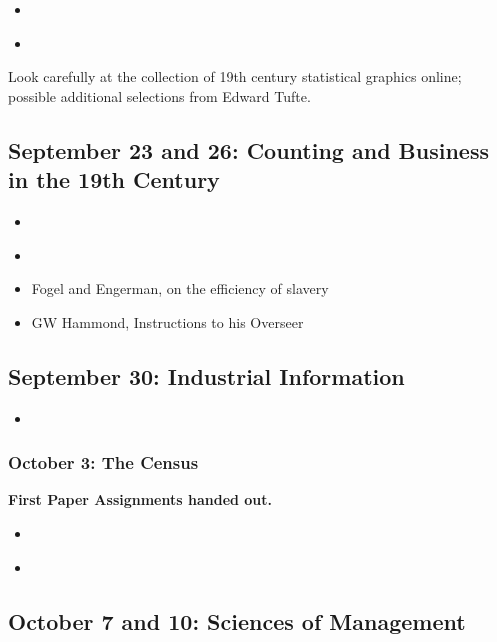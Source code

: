 \begin{itemize}
\itemsep1pt\parskip0pt
\item
  \cite{borges_analytical_1999}
\item
  \cite[Introduction and Chapter 3]{foucault_order_1994}
\end{itemize}

Look carefully at the collection of 19th century statistical graphics
online; possible additional selections from Edward Tufte.

\subsection{September 23 and 26: Counting and Business in the 19th
Century}

\begin{itemize}
\itemsep1pt\parskip0pt
\item
  \cite{edwards_early_1960}\\
\item
  \cite{garvey_facts_2013}
\item
  Fogel and Engerman, on the efficiency of slavery
\item
  GW Hammond, Instructions to his Overseer
\end{itemize}

\subsection{September 30: Industrial Information}

\begin{itemize}
\itemsep1pt\parskip0pt
\item
  \cite[selections]{beniger_control_1986}
\end{itemize}

\subsubsection{October 3: The Census}

\textbf{First Paper Assignments handed out.}

\begin{itemize}
\itemsep1pt\parskip0pt
\item
  \cite{kinnahan_charting_2008}
\item
  \cite[Chapters 3 to 5]{anderson_american_1988}
\end{itemize}

\subsection{October 7 and 10: Sciences of Management}

